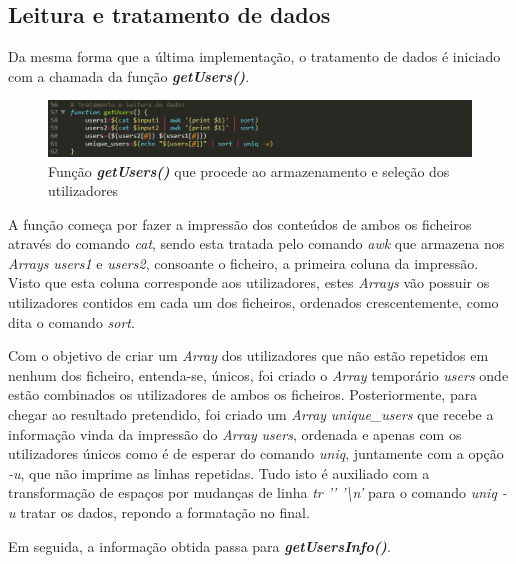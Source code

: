 \documentclass[10pt,portuguese]{article}
\begin{document}
\subsection{Leitura e tratamento de dados}
\newline
\par Da mesma forma que a última implementação, o tratamento de dados é iniciado com a chamada da função \textbf{\textit{getUsers()}}.
\begin{figure}[!h]
    \centering
    \includegraphics[width=\textwidth]{comparestats/getUsers_c.png}
    \caption{Função \textbf{\textit{getUsers()}} que procede ao armazenamento e seleção dos utilizadores}
\end{figure}
\par A função começa por fazer a impressão dos conteúdos de ambos os ficheiros através do comando \textit{cat}, sendo esta tratada pelo comando \textit{awk} que armazena nos \textit{Arrays} \textit{users1} e \textit{users2}, consoante o ficheiro, a primeira coluna da impressão. Visto que esta coluna corresponde aos utilizadores, estes \textit{Arrays} vão possuir os utilizadores contidos em cada um dos ficheiros, ordenados crescentemente, como dita o comando \textit{sort}.
\par Com o objetivo de criar um \textit{Array} dos utilizadores que não estão repetidos em nenhum dos ficheiro, entenda-se, únicos, foi criado o \textit{Array} temporário \textit{users} onde estão combinados os utilizadores de ambos os ficheiros. Posteriormente, para chegar ao resultado pretendido, foi criado um \textit{Array} \textit{unique\_users} que recebe a informação vinda da impressão do \textit{Array} \textit{users}, ordenada e apenas com os utilizadores únicos como é de esperar do comando \textit{uniq}, juntamente com a opção \textit{-u}, que não imprime as linhas repetidas. Tudo isto é auxiliado com a transformação de espaços por mudanças de linha \textit{tr '\hspace{0.2cm}'\hspace{0.2cm} '\textbackslash n'} para o comando \textit{uniq -u} tratar os dados, repondo a formatação no final.
\newline
\newline
\par Em seguida, a informação obtida passa para \textbf{\textit{getUsersInfo()}}.
\end{document}
